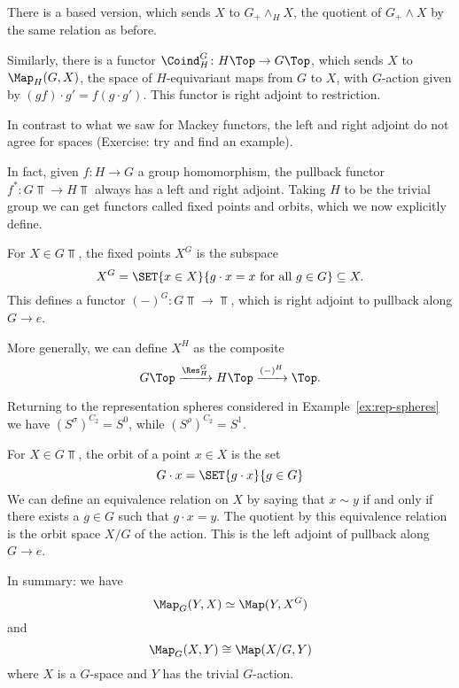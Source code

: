\documentclass{willowtreebook}
\begin{document}
\begin{remark}
    There is a based version, which sends $X$ to $G_+ \wedge_HX $, the quotient of $G_+ \wedge X$ by the same relation as before. 
\end{remark}
\begin{remark}
    Similarly, there is a functor $\Coind_H^G \colon H\Top \to G\Top$, which sends $X$ to $\Map_H(G,X)$, the space of $H$-equivariant maps from $G$ to $X$, with $G$-action given by $(gf) \cdot g' = f(g \cdot g')$. This functor is right adjoint to restriction.

    In contrast to what we saw for Mackey functors, the left and right adjoint do not agree for spaces (Exercise: try and find an example). 
\end{remark}
\begin{remark}
    In fact, given $f \colon H \to G$ a group homomorphism, the pullback functor $f^* \colon G\Top \to H\Top$ always has a left and right adjoint. Taking $H$ to be the trivial group we can get functors called fixed points and orbits, which we now explicitly define. 
\end{remark}
\begin{definition}
    For $X \in G\Top$, the fixed points $X^G$ is the subspace
    \[
    X^G = \SET{x \in X}{g \cdot x = x \text{ for all } g \in G} \subseteq X.
    \]
This defines a functor $(-)^G \colon G\Top \to \Top$, which is right adjoint to pullback along $G \to e$. 
    
    More generally, we can define $X^H$ as the composite
    \[
    G\Top \xrightarrow{\Res^G_H} H\Top \xrightarrow{(-)^H} \Top.
    \]
\end{definition}
\begin{example}
    Returning to the representation spheres considered in Example~\eqref{ex:rep-spheres} we have $(S^{\sigma})^{C_2}  = S^0$, while $(S^{\rho})^{C_2} = S^1$. 
\end{example}
\begin{definition}
   For $X \in G\Top$, the orbit of a point $x \in X$ is the set 
   \[
   G \cdot x = \SET{g \cdot x}{g \in G}
   \]
   We can define an equivalence relation on $X$ by saying that $x \sim y$ if and only if there exists a $g \in G$ such that $g \cdot x = y$. The quotient by this equivalence relation is the orbit space $X/G$ of the action. This is the left adjoint of pullback along $G \to e$. 
\end{definition}
\begin{remark}
In summary: we have
\[
\Map_G(Y,X) \simeq \Map(Y,X^G)
\]
and
\[
\Map_G(X,Y) \cong \Map(X/G,Y)
\]
where $X$ is a $G$-space and $Y$ has the trivial $G$-action. 
\end{remark}
\end{document}
